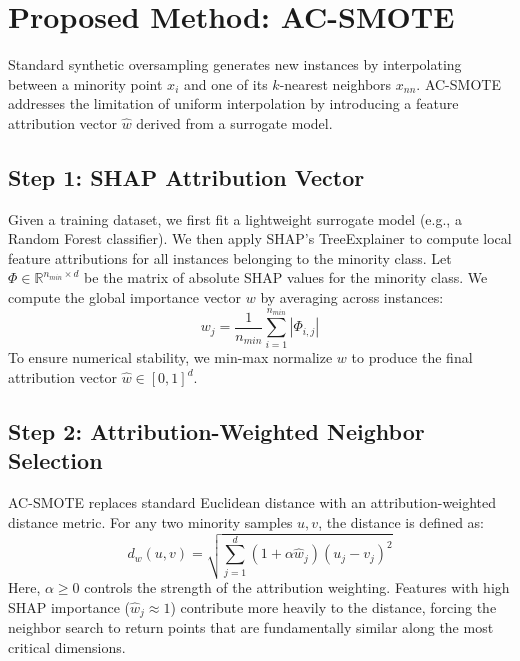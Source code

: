 \documentclass[conference,a4paper]{IEEEtran}
\begin{document}
\section{Proposed Method: AC-SMOTE}

Standard synthetic oversampling generates new instances by interpolating between a minority point $x_i$ and one of its $k$-nearest neighbors $x_{nn}$. AC-SMOTE addresses the limitation of uniform interpolation by introducing a feature attribution vector $\hat{w}$ derived from a surrogate model.

\subsection{Step 1: SHAP Attribution Vector}
Given a training dataset, we first fit a lightweight surrogate model (e.g., a Random Forest classifier). We then apply SHAP's TreeExplainer to compute local feature attributions for all instances belonging to the minority class. Let $\Phi \in \mathbb{R}^{n_{min} \times d}$ be the matrix of absolute SHAP values for the minority class. We compute the global importance vector $w$ by averaging across instances:
\begin{equation}
w_j = \frac{1}{n_{min}} \sum_{i=1}^{n_{min}} |\Phi_{i,j}|
\end{equation}
To ensure numerical stability, we min-max normalize $w$ to produce the final attribution vector $\hat{w} \in [0, 1]^d$.

\subsection{Step 2: Attribution-Weighted Neighbor Selection}
AC-SMOTE replaces standard Euclidean distance with an attribution-weighted distance metric. For any two minority samples $u, v$, the distance is defined as:
\begin{equation}
d_w(u, v) = \sqrt{\sum_{j=1}^d \left( 1 + \alpha \hat{w}_j \right) (u_j - v_j)^2}
\end{equation}
Here, $\alpha \geq 0$ controls the strength of the attribution weighting. Features with high SHAP importance ($\hat{w}_j \approx 1$) contribute more heavily to the distance, forcing the neighbor search to return points that are fundamentally similar along the most critical dimensions.
\end{document}
